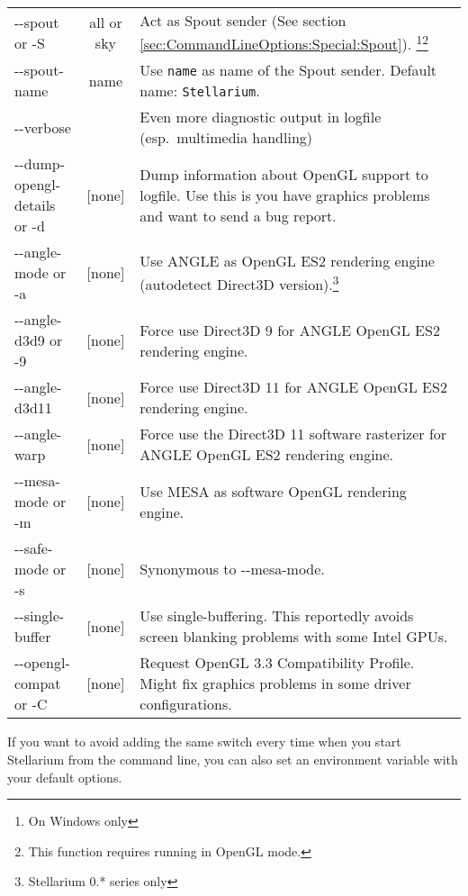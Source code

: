 \begin{longtable}{l|c|p{68mm}}
-\/-spout  or -S     & all or sky & Act as Spout sender (See section \ref{sec:CommandLineOptions:Special:Spout}).%
                                    \footnote{On Windows only}\footnote{This function requires running in OpenGL mode.}\\
-\/-spout-name       & name       & Use \texttt{name} as name of the Spout sender. Default name: \texttt{Stellarium}.\footnotemark[1]\\\midrule									
-\/-verbose          &            & Even more diagnostic output in logfile (esp.\ multimedia handling)\\
-\/-dump-opengl-details or -d     & {[}none{]} & Dump information about OpenGL support to logfile. 
                                                 Use this is you have graphics problems and want to send a bug report. \\\midrule
-\/-angle-mode or -a & {[}none{]} & Use ANGLE as OpenGL ES2 rendering engine (autodetect Direct3D version).\footnotemark[1]\footnote{Stellarium 0.* series only}\\
-\/-angle-d3d9 or -9 & {[}none{]} & Force use Direct3D 9 for ANGLE OpenGL ES2 rendering engine.\footnotemark[1]\footnotemark[3]\\
-\/-angle-d3d11      & {[}none{]} & Force use Direct3D 11 for ANGLE OpenGL ES2 rendering engine.\footnotemark[1]\footnotemark[3]\\
-\/-angle-warp       & {[}none{]} & Force use the Direct3D 11 software rasterizer for ANGLE OpenGL ES2 rendering engine.\footnotemark[1]\footnotemark[3]\\
-\/-mesa-mode or -m  & {[}none{]} & Use MESA as software OpenGL rendering engine.\footnotemark[1]\\
-\/-safe-mode or -s  & {[}none{]} & Synonymous to -\/-mesa-mode.\footnotemark[1]\\
-\/-single-buffer    & {[}none{]} & Use single-buffering. This reportedly avoids screen blanking problems with some Intel GPUs. \\
-\/-opengl-compat or -C & {[}none{]} & Request OpenGL 3.3 Compatibility Profile. Might fix graphics problems in some driver configurations.\\
\bottomrule
\end{longtable}

\noindent {} If you want to avoid adding the same
switch every time when you start Stellarium from the command line, you
can also set an environment variable  with your
default options. 

